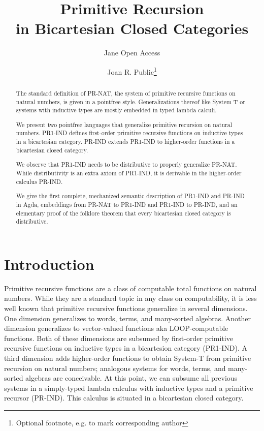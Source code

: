 \documentclass[a4paper,USenglish,cleveref, autoref, thm-restate]{lipics-v2021}
\title{Primitive Recursion \\ in Bicartesian Closed Categories} %
\author{Jane {Open Access}}{Dummy University Computing Laboratory, [optional: Address], Country \and My second affiliation, Country \and \url{http://www.myhomepage.edu} }{johnqpublic@dummyuni.org}{https://orcid.org/0000-0002-1825-0097}{}%
\author{Joan R. Public\footnote{Optional footnote, e.g. to mark corresponding author}}{Department of Informatics, Dummy College, [optional: Address], Country}{joanrpublic@dummycollege.org}{[orcid]}{}
\begin{document}
\maketitle

\begin{abstract}
  The standard definition of PR-NAT, the system of primitive recursive functions on natural
  numbers, is given in a pointfree style. Generalizations thereof like
  System T or systems with inductive types are mostly embedded in
  typed lambda calculi.

  We present two pointfree languages that generalize primitive
  recursion on natural numbers. PR1-IND defines
  first-order primitive recursive functions on inductive types in a bicartesian
  category. PR-IND extends PR1-IND to higher-order functions in a
  bicartesian closed category.

  We observe that PR1-IND needs to be distributive to properly
  generalize PR-NAT. While distributivity is an extra axiom of
  PR1-IND, it is derivable in the higher-order calculus PR-IND.

  We give the first complete, mechanized semantic description of
  PR1-IND and PR-IND in Agda, embeddings from PR-NAT to PR1-IND and
  PR1-IND to PR-IND, and an elementary proof of the folklore theorem
  that every bicartesian closed category is distributive. 
\end{abstract}

\section{Introduction}
\label{sec:introduction}

Primitive recursive functions are a class of computable total
functions on natural numbers. While they are a standard topic in any
class on computability, it is less well known that primitive recursive
functions generalize in several dimensions. One dimension generalizes
to words, terms, and many-sorted algebras. Another dimension
generalizes to vector-valued functions aka LOOP-computable
functions. Both of these dimensions are 
subsumed by first-order primitive recursive functions on inductive
types in a bicartesion category (PR1-IND). 
A third dimension adds higher-order functions to obtain System-T from
primitive recursion on natural numbers; analogous systems for
words, terms, and many-sorted algebras are conceivable. At this point, we can subsume
all previous systems in a simply-typed lambda calculus with
inductive types and a primitive recursor (PR-IND). This calculus is
situated in a bicartesian closed category.
\end{document}
